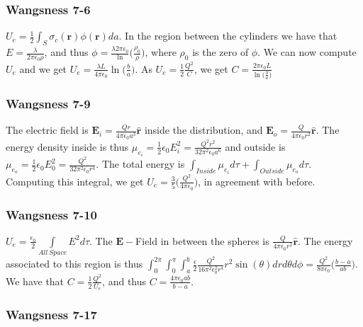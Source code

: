 \documentclass[oneside]{book}
\theoremstyle{definition}
\newcommand*\B[1]{\mathbf{#1}}
\newcommand*\Bh[1]{\mathbf{\hat{#1}}}
\begin{document}
\subsubsection{Wangsness 7-6}

\begin{figure}[!h]
  \centering
\end{figure}

$U_e = \frac{1}{2}\int_{S}\sigma_c(\B{r})\phi(\B{r})da$. In the region between the cylinders we have that $E = \frac{\lambda}{2\pi \epsilon_0 \rho}$, and thus $\phi= \frac{\lambda 2\pi \epsilon_0}\ln\big(\frac{\rho_0}{\rho}\big)$, where $\rho_0$ is the zero of $\phi$. We can now compute $U_e$ and we get $U_e = \frac{\lambda L}{4\pi \epsilon_0}\ln\big(\frac{b}{a}\big)$. As $U_e = \frac{1}{2}\frac{Q^2}{C}$, we get $C= \frac{2\pi \epsilon_0 L}{\ln\big(\frac{b}{a}\big)}$

\subsubsection{Wangsness 7-9}

The electric field is $\B{E}_i = \frac{Qr}{4\pi \epsilon_0 a^3}\Bh{r}$ inside the distribution, and $\B{E}_o = \frac{Q}{4\pi\epsilon_0r^2}\Bh{r}$. The energy density inside is thus $\mu_{e_i} = \frac{1}{2}\epsilon_0 E_i^2=\frac{Q^2r^2}{32\pi^2 \epsilon_0 a^6}$ and outside is $\mu_{e_o} = \frac{1}{2}\epsilon_0 E_0^2 = \frac{Q^2}{32\pi^2 \epsilon_0 r^4}$. The total energy is $\int_{Inside} \mu_{e_i}d\tau + \int_{Outside} \mu_{e_o}d\tau$. Computing this integral, we get $U_e = \frac{3}{5}\bigg( \frac{Q^2}{4\pi \epsilon_0}\bigg)$, in agreement with before.

\subsubsection{Wangsness 7-10}

$U_e = \frac{\epsilon_0}{2} \underset{All\ Space}\int E^2 d\tau$. The $\B{E}-$Field in between the spheres is $\frac{Q}{4\pi \epsilon_0 r^2}\Bh{r}$. The energy associated to this region is thus $\int_{0}^{2\pi}\int_{0}^{\pi}\int_{a}^{b} \frac{\epsilon}{2} \frac{Q^2}{16\pi^2 \epsilon_0^2 r^4}r^2\sin(\theta) dr d\theta d\phi = \frac{Q^2}{8\pi \epsilon_0}\bigg(\frac{b-a}{ab}\bigg)$. We have that $C = \frac{1}{2} \frac{Q^2}{U_e}$, and thus $C = \frac{4\pi \epsilon_0 ab}{b-a}$.

\subsubsection{Wangsness 7-17}
\end{document}
